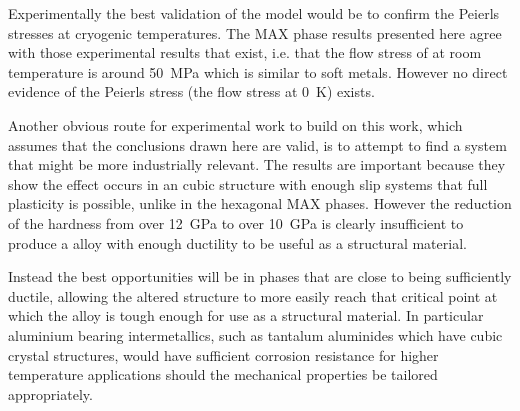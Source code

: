 Experimentally the best validation of the model would be to confirm the Peierls stresses at cryogenic temperatures. The MAX phase results presented here agree with those experimental results that exist, i.e. that the flow stress of  at room temperature is around \SI{50}{\mega\pascal} which is similar to soft metals. However no direct evidence of the Peierls stress (the flow stress at \SI{0}{\kelvin}) exists.

Another obvious route for experimental work to build on this work, which assumes that the conclusions drawn here are valid, is to attempt to find a system that might be more industrially relevant. The  results are important because they show the effect occurs in an cubic structure with enough slip systems that full plasticity is possible, unlike in the hexagonal MAX phases. However the reduction of the hardness from over \SI{12}{\giga\pascal} to over \SI{10}{\giga\pascal} is clearly insufficient to produce a alloy with enough ductility to be useful as a structural material.

Instead the best opportunities will be in phases that are close to being sufficiently ductile, allowing the altered structure to more easily reach that critical point at which the alloy is tough enough for use as a structural material. In particular aluminium bearing intermetallics, such as tantalum aluminides which have cubic crystal structures, would have sufficient corrosion resistance for higher temperature applications should the mechanical properties be tailored appropriately.

